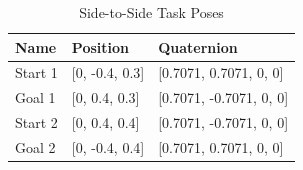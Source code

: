 \documentclass[defaultstyle,11pt]{thesis}
\begin{document}
\begin{table}[H]
    \centering
    \caption{Side-to-Side Task Poses}
    \label{tab:sideToSidePoses}
    \begin{tabular}{lll}
    \hline
    \textbf{Name} & \textbf{Position} & \textbf{Quaternion} \\
    \hline
    Start 1 & [0, -0.4, 0.3] & [0.7071, 0.7071, 0, 0] \\
    Goal 1 & [0, 0.4, 0.3] & [0.7071, -0.7071, 0, 0] \\
    Start 2 & [0, 0.4, 0.4] & [0.7071, -0.7071, 0, 0] \\
    Goal 2 & [0, -0.4, 0.4] & [0.7071, 0.7071, 0, 0] \\
    \hline
    \end{tabular}
\end{table}
\end{document}

